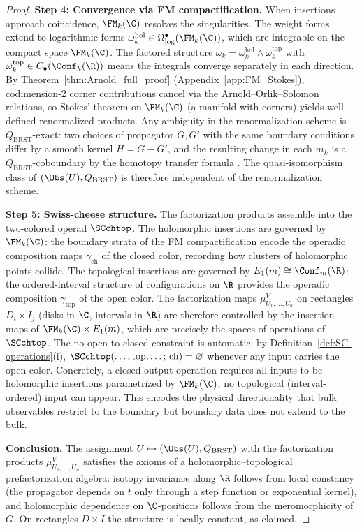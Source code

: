 \begin{proof}
\medskip\noindent\textbf{Step 4: Convergence via FM compactification.}
When insertions approach coincidence, $\FM_k(\C)$ resolves the singularities. The weight forms extend to logarithmic forms $\omega_k^{\mathrm{hol}}\in\Omega^\bullet_{\log}(\FM_k(\C))$, which are integrable on the compact space $\FM_k(\C)$. The factored structure $\omega_k = \omega_k^{\mathrm{hol}}\wedge\omega_k^{\mathrm{top}}$ with $\omega_k^{\mathrm{top}}\in C_\bullet(\Conf_k(\R))$ means the integrals converge separately in each direction. By Theorem~\ref{thm:Arnold_full_proof} (Appendix~\ref{app:FM_Stokes}), codimension-2 corner contributions cancel via the Arnold--Orlik--Solomon relations, so Stokes' theorem on $\FM_k(\C)$ (a manifold with corners) yields well-defined renormalized products. Any ambiguity in the renormalization scheme is $Q_{\mathrm{BRST}}$-exact: two choices of propagator $G, G'$ with the same boundary conditions differ by a smooth kernel $H = G - G'$, and the resulting change in each $m_k$ is a $Q_{\mathrm{BRST}}$-coboundary by the homotopy transfer formula \cite[Theorem~5.2.2.1]{CG17}. The quasi-isomorphism class of $(\Obs(U), Q_{\mathrm{BRST}})$ is therefore independent of the renormalization scheme.

\medskip\noindent\textbf{Step 5: Swiss-cheese structure.}
The factorization products assemble into the two-colored operad $\SCchtop$. The holomorphic insertions are governed by $\FM_k(\C)$: the boundary strata of the FM compactification encode the operadic composition maps $\gamma_{\mathrm{ch}}$ of the closed color, recording how clusters of holomorphic points collide. The topological insertions are governed by $E_1(m) \cong \Conf_m(\R)$: the ordered-interval structure of configurations on $\R$ provides the operadic composition $\gamma_{\mathrm{top}}$ of the open color. The factorization maps $\mu^V_{U_1,\ldots,U_n}$ on rectangles $D_i\times I_j$ (disks in $\C$, intervals in $\R$) are therefore controlled by the insertion maps of $\FM_k(\C)\times E_1(m)$, which are precisely the spaces of operations of $\SCchtop$. The no-open-to-closed constraint is automatic: by Definition~\ref{def:SC-operations}(i), $\SCchtop(\ldots,\mathrm{top},\ldots;\,\mathrm{ch})=\varnothing$ whenever any input carries the open color. Concretely, a closed-output operation requires all inputs to be holomorphic insertions parametrized by $\FM_k(\C)$; no topological (interval-ordered) input can appear. This encodes the physical directionality that bulk observables restrict to the boundary but boundary data does not extend to the bulk.

\medskip\noindent\textbf{Conclusion.}
The assignment $U\mapsto (\Obs(U), Q_{\mathrm{BRST}})$ with the factorization products $\mu^V_{U_1,\ldots,U_n}$ satisfies the axioms of a holomorphic--topological prefactorization algebra: isotopy invariance along $\R$ follows from local constancy (the propagator depends on $t$ only through a step function or exponential kernel), and holomorphic dependence on $\C$-positions follows from the meromorphicity of $G$. On rectangles $D\times I$ the structure is locally constant, as claimed.
\end{proof}

